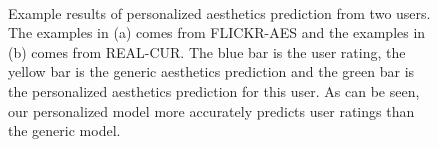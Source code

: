 \documentclass[10pt,twocolumn,letterpaper]{article}
\begin{document}
\begin{figure}
\centering
{}%
\\
\caption{Example results of personalized aesthetics prediction from two users. The examples in (a) comes from FLICKR-AES and the examples in (b) comes from REAL-CUR. The blue bar is the user rating, the yellow bar is the generic aesthetics prediction and the green bar is the personalized aesthetics prediction for this user. As can be seen, our personalized model more accurately predicts user ratings than the generic model.
}
\vspace{-0.2in}
\label{examples}
\end{figure}




\end{document}

